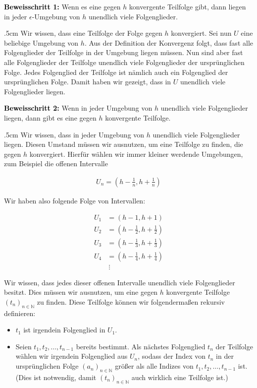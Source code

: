 \documentclass[fontsize=9pt,
               parskip=half-,
               DIV=14,
               listof=chapterentry,
               tocflat]{scrbook}
\newenvironment{indentblock}{\begin{adjustwidth}{.5cm}{}}{\end{adjustwidth}}
\newcommand{\proofstep}[1]{\textbf{\textcolor{Black}{#1}}}
\begin{document}
\begin{proof*}
\proofstep{Beweisschritt 1:}
 Wenn es eine gegen $h$ konvergente Teilfolge gibt, dann liegen in jeder $\epsilon $-Umgebung von $h$ unendlich viele Folgenglieder.\begin{indentblock}
Wir wissen, dass eine Teilfolge der Folge gegen $h$ konvergiert. Sei nun $U$ eine beliebige Umgebung von $h$. Aus der Definition der Konvergenz folgt, dass fast alle Folgenglieder der Teilfolge in der Umgebung liegen müssen. Nun sind aber fast alle Folgenglieder der Teilfolge unendlich viele Folgenglieder der ursprünglichen Folge. Jedes Folgenglied der Teilfolge ist nämlich auch ein Folgenglied der ursprünglichen Folge. Damit haben wir gezeigt, dass in $U$ unendlich viele Folgenglieder liegen.

\end{indentblock}

\proofstep{Beweisschritt 2:}
 Wenn in jeder Umgebung von $h$ unendlich viele Folgenglieder liegen, dann gibt es eine gegen $h$ konvergente Teilfolge.\begin{indentblock}
Wir wissen, dass in jeder Umgebung von $h$ unendlich viele Folgenglieder liegen. Diesen Umstand müssen wir ausnutzen, um eine Teilfolge zu finden, die gegen $h$ konvergiert. Hierfür wählen wir immer kleiner werdende Umgebungen, zum Beispiel die offenen Intervalle

\begin{align*}
U_{n}=\left(h-{\tfrac {1}{n}},h+{\tfrac {1}{n}}\right)
\end{align*}

Wir haben also folgende Folge von Intervallen:

\begin{align*}
U_{1}&=\left(h-1,h+1\right)\\U_{2}&=\left(h-{\tfrac {1}{2}},h+{\tfrac {1}{2}}\right)\\U_{3}&=\left(h-{\tfrac {1}{3}},h+{\tfrac {1}{3}}\right)\\U_{4}&=\left(h-{\tfrac {1}{4}},h+{\tfrac {1}{4}}\right)\\&\ \vdots 
\end{align*}

Wir wissen, dass jedes dieser offenen Intervalle unendlich viele Folgenglieder besitzt. Dies müssen wir ausnutzen, um eine gegen $h$ konvergente Teilfolge $(t_{n})_{n\in \mathbb {N} }$ zu finden. Diese Teilfolge können wir folgendermaßen rekursiv definieren:

\begin{itemize}
\item $t_{1}$ ist irgendein Folgenglied in $U_{1}$.
\item Seien $t_{1},t_{2},\ldots ,t_{n-1}$ bereits bestimmt. Als nächstes Folgenglied $t_{n}$ der Teilfolge wählen wir irgendein Folgenglied aus $U_{n}$, sodass der Index von $t_{n}$ in der ursprünglichen Folge $(a_{n})_{n\in \mathbb {N} }$ größer als alle Indizes von $t_{1},t_{2},\ldots ,t_{n-1}$ ist. (Dies ist notwendig, damit $(t_{n})_{n\in \mathbb {N} }$ auch wirklich eine Teilfolge ist.)
\end{itemize}


\end{indentblock}
\end{proof*}
\end{document}
